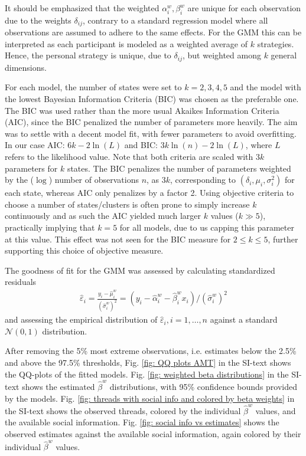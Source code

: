 \documentclass[9pt,a4paper,twocolumn,lineno]{article}
\begin{document}
It should be emphasized that the weighted $\alpha_i^w,\beta_i^w$ are unique for each observation due to the weights $\delta_{ij}$, contrary to a standard regression model where all observations are assumed to adhere to the same effects. For the GMM this can be interpreted as each participant is modeled as a weighted average of $k$ strategies. Hence, the personal strategy is unique, due to $\delta_{ij}$, but weighted among $k$ general dimensions.

For each model, the number of states were set to $k=2,3,4,5$ and the model with the lowest Bayesian Information Criteria (BIC) was chosen as the preferable one. The BIC was used rather than the more usual Akaikes Information Criteria (AIC), since the BIC penalized the number of parameters more heavily. The aim was to settle with a decent model fit, with fewer parameters to avoid overfitting. 
In our case AIC: $6k-2\ln(L)$ and BIC: $3k\ln(n)-2\ln(L)$, where $L$ refers to the likelihood value. Note that both criteria are scaled with $3k$ parameters for $k$ states. The BIC penalizes the number of parameters weighted by the ($\log$) number of observations $n$,
as $3k$, corresponding to $(\delta_i,\mu_i,\sigma^2_i)$ for each state, whereas AIC only penalizes by a factor 2. 
Using objective criteria to choose a number of states/clusters is often prone to simply increase $k$ continuously \cite{hastie2009} and as such the AIC yielded much larger $k$ values ($k \gg 5$), practically implying that $k=5$ for all models, due to us capping this parameter at this value. This effect was not seen for the BIC measure for $2\leq k \leq 5$, further supporting this choice of objective measure.


The goodness of fit for the GMM was assessed by calculating standardized residuals
\begin{align}
 	\hat{\varepsilon}_i = \frac{y_i - \hat{\mu}^w_i}{(\hat{\sigma}^w_i)^2} = (y_i - \hat{\alpha}^w_i-\hat{\beta}^w_ix_i)/(\hat{\sigma}^w_i)^2 \label{eq: GMM residuals}
\end{align}
and assessing the empirical distribution of $\hat{\varepsilon}_i, i=1,\dots,n$ against a standard $\mathcal{N}(0,1)$ distribution.

After removing the 5\% most extreme observations, i.e. estimates below the 2.5\% and above the 97.5\% thresholds, Fig. \ref{fig: QQ plots AMT} in the SI-text shows the QQ-plots of the fitted models. Fig. \ref{fig: weighted beta distributions} in the SI-text shows the estimated $\hat{\beta}^w$ distributions, with 95\% confidence bounds provided by the models. Fig. \ref{fig: threads with social info and colored by beta weights} in the SI-text shows the observed threads, colored by the individual $\hat{\beta}^w$ values, and the available social information. Fig. \ref{fig: social info vs estimates} shows the observed estimates against the available social information, again colored by their individual $\hat{\beta}^w$ values.
\end{document}
